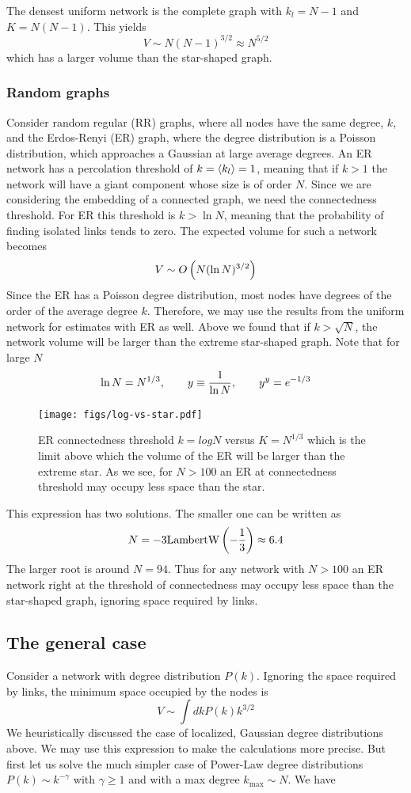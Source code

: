 \documentclass[nofootinbib,preprint,floatfix,titlepage,endfloats,superscriptaddress]{revtex4} %
\begin{document}
The densest uniform network is the complete graph with $k_l=N-1$ and $K= N(N-1)$. This yields
\[V \sim N(N-1)^{3/2} \approx N^{5/2}\]
which has a larger volume than the star-shaped graph. 
\subsubsection{Random graphs}
Consider random regular (RR) graphs, where all nodes have the same degree, $k$, and the Erdos-Renyi (ER) graph, where the degree distribution is a Poisson distribution, which approaches a Gaussian at large average degrees. An ER network has a percolation threshold of $k = \left<k_l\right> = 1 $, meaning that if $k>1$ the network will have a giant component whose size is of order $N$. Since we are considering the embedding of a connected graph, we need the connectedness threshold. For ER this threshold is\cite{erdos1960connected} $k > \ln N$, meaning that the probability of finding isolated links tends to zero. The expected volume for such a network becomes
\begin{equation}
    V \sim O\left(N (\ln N)^{3/2}\right)
\end{equation}
Since the ER has a Poisson degree distribution, most nodes have degrees of the order of the average degree $k$. Therefore, we may use the results from the uniform network for estimates with ER as well.  
Above we found that if $k> \sqrt{N}$, the network volume will be larger than the extreme star-shaped graph. Note that for large $N$ 
\begin{align}
    \ln N  = N^{1/3},\qquad 
    y  \equiv {1\over \ln N},\qquad    
    y^y = e^{-1/3}
\end{align}
\begin{figure}
    \centering
    \texttt{[image: figs/log-vs-star.pdf]}
    \caption{ER connectedness threshold $k= log N$  versus $K = N^{1/3}$ which is the limit above which the volume of the ER will be larger than the extreme star.  As we see, for $N>100$ an ER at connectedness threshold may occupy less space than the star.}
    \label{fig:logstar}
\end{figure}
This expression has two solutions. The smaller one can be written as 
$$ N = -3 \mathrm{LambertW}\left(-{1\over 3}\right) \approx 6.4 $$ 
The larger root is around $N = 94$. Thus for any network with $N >100$ an ER network right at the threshold of connectedness may occupy less space than the star-shaped graph, ignoring space required by links. 

\subsection{The general case}
Consider a network with degree distribution $P(k)$. Ignoring the space required by links, the minimum space occupied by the nodes is 
\[V \sim \int dk P(k) k^{3/2} \]
We heuristically discussed the case of localized, Gaussian degree distributions above. We may use this expression to make the calculations more precise. But first let us solve the much simpler case of Power-Law degree distributions $P(k) \sim k^{-\gamma}$ with $\gamma \geq 1$ and with a max degree $k_{\mathrm{max}} \sim N$. We have
\end{document}
